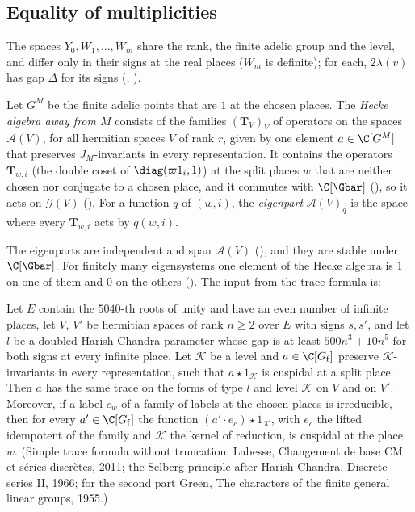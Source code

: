 \subsection{Equality of multiplicities}\label{sp-moment:ss:mult}

The spaces $Y_0,W_1,\dots,W_m$ share the rank, the finite adelic group and the level, and differ
only in their signs at the real places ($W_m$ is definite); for each, $2\lambda(v)$ has gap $\Delta$
for its signs (, ).

\begin{definition}
Let $G^M$ be the finite adelic points that are $1$ at the chosen places. The \emph{Hecke algebra
away from $M$} consists of the families $(\mathbf T_V)_V$ of operators on the spaces $\mathcal A(V)$, for
all hermitian spaces $V$ of rank $r$, given by one element $a\in\C[G^M]$ that preserves
$J_M$-invariants in every representation. It contains the operators $\mathbf T_{w,i}$ (the double coset of
$\diag(\varpi1_i,1)$) at the split places $w$ that are neither chosen nor conjugate to a chosen
place, and it commutes with $\C[\Gbar]$ (), so it
acts on $\mathcal G(V)$ (). For a function $q$ of $(w,i)$, the
\emph{eigenpart} $\mathcal A(V)_q$ is the space where every $\mathbf T_{w,i}$ acts by $q(w,i)$.
\end{definition}

The eigenparts are independent and span $\mathcal A(V)$
(), and they are stable under $\C[\Gbar]$. For finitely many
eigensystems one element of the Hecke algebra is $1$ on one of them and $0$ on the others
(). The input from the trace formula is:

\begin{fact}\label{sp-moment:fact:trace}
Let $E$ contain the $5040$-th roots of unity and have an even number of infinite places, let $V$,
$V'$ be hermitian spaces of rank $n\ge2$ over $E$ with signs $s,s'$, and let $l$ be a doubled
Harish-Chandra parameter whose gap is at least $500n^3+10n^5$ for both signs at every infinite
place. Let $\mathcal K$ be a level and $a\in\C[G_{\mathrm f}]$ preserve $\mathcal K$-invariants in every representation, such
that $a\star1_{\mathcal K}$ is cuspidal at a split place. Then $a$ has the same trace on the forms of type
$l$ and level $\mathcal K$ on $V$ and on $V'$. Moreover, if a label $c_w$ of a family of labels at the
chosen places is irreducible, then for every $a'\in\C[G_{\mathrm f}]$ the function
$(a'\cdot e_c)\star1_{\mathcal K}$, with $e_c$ the lifted idempotent of the family and $\mathcal K$ the kernel of
reduction, is cuspidal at the place $w$. (Simple trace formula without truncation; Labesse,
Changement de base CM et séries discrètes, 2011; the Selberg principle after Harish-Chandra,
Discrete series II, 1966; for the second part Green, The characters of the finite general linear
groups, 1955.)
\end{fact}

